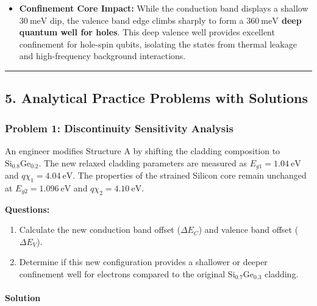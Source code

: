 \documentclass[
]{article}
\providecommand{\tightlist}{%
  \setlength{\itemsep}{0pt}\setlength{\parskip}{0pt}}
\begin{document}
\begin{itemize}
\tightlist
\item
  \textbf{Confinement Core Impact:} While the conduction band displays a
  shallow \(30\ \text{meV}\) dip, the valence band edge climbs sharply
  to form a \textbf{\(360\ \text{meV}\) deep quantum well for holes}.
  This deep valence well provides excellent confinement for hole-spin
  qubits, isolating the states from thermal leakage and high-frequency
  background interactions.
\end{itemize}

\begin{center}\rule{0.5\linewidth}{0.5pt}\end{center}

\subsection{5. Analytical Practice Problems with
Solutions}\label{analytical-practice-problems-with-solutions}

\subsubsection{Problem 1: Discontinuity Sensitivity
Analysis}\label{problem-1-discontinuity-sensitivity-analysis}

An engineer modifies Structure A by shifting the cladding composition to
\(\text{Si}_{0.8}\text{Ge}_{0.2}\). The new relaxed cladding parameters
are measured as \(E_{g1} = 1.04\ \text{eV}\) and
\(q\chi_1 = 4.04\ \text{eV}\). The properties of the strained Silicon
core remain unchanged at \(E_{g2} = 1.096\ \text{eV}\) and
\(q\chi_2 = 4.10\ \text{eV}\).

\textbf{Questions:}

\begin{enumerate}
\def\labelenumi{\arabic{enumi}.}
\tightlist
\item
  Calculate the new conduction band offset (\(\Delta E_C\)) and valence
  band offset (\(\Delta E_V\)).
\item
  Determine if this new configuration provides a shallower or deeper
  confinement well for electrons compared to the original
  \(\text{Si}_{0.7}\text{Ge}_{0.3}\) cladding.
\end{enumerate}

\paragraph{Solution}\label{solution}
\end{document}
